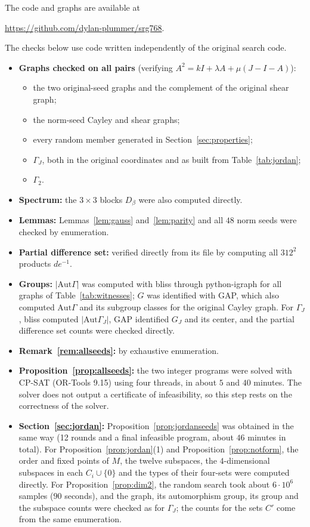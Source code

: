 \documentclass[11pt]{amsart}
\theoremstyle{definition}
\newcommand{\Aut}{\mathrm{Aut}}
\begin{document}
The code and graphs are available at
\begin{center}\url{https://github.com/dylan-plummer/srg768}.\end{center}
The checks below use code written independently of the original search code.
\begin{itemize}
\item \textbf{Graphs checked on all pairs} (verifying $A^2=kI+\lambda A+\mu(J-I-A)$):
  \begin{itemize}
  \item the two original-seed graphs and the complement of the original shear graph;
  \item the norm-seed Cayley and shear graphs;
  \item every random member generated in Section~\ref{sec:properties};
  \item $\Gamma_J$, both in the original coordinates and as built from Table~\ref{tab:jordan};
  \item $\Gamma_2$.
  \end{itemize}
\item \textbf{Spectrum:} the $3\times3$ blocks $D_\beta$ were also computed directly.
\item \textbf{Lemmas:} Lemmas~\ref{lem:gauss} and~\ref{lem:parity} and all $48$ norm seeds were checked by enumeration.
\item \textbf{Partial difference set:} verified directly from its file by computing all $312^2$ products $de^{-1}$.
\item \textbf{Groups:} $|\Aut\Gamma|$ was computed with bliss through python-igraph for all graphs of Table~\ref{tab:witnesses}; $G$ was identified with GAP, which also computed $\Aut\Gamma$ and its subgroup classes for the original Cayley graph. For $\Gamma_J$, bliss computed $|\Aut\Gamma_J|$, GAP identified $G_J$ and its center, and the partial difference set counts were checked directly.
\item \textbf{Remark~\ref{rem:allseeds}:} by exhaustive enumeration.
\item \textbf{Proposition~\ref{prop:allseeds}:} the two integer programs were solved with CP-SAT (OR-Tools 9.15) using four threads, in about $5$ and $40$ minutes. The solver does not output a certificate of infeasibility, so this step rests on the correctness of the solver.
\item \textbf{Section~\ref{sec:jordan}:} Proposition~\ref{prop:jordanseeds} was obtained in the same way (12 rounds and a final infeasible program, about $46$ minutes in total). For Proposition~\ref{prop:jordan}(1) and Proposition~\ref{prop:notform}, the order and fixed points of $M$, the twelve subspaces, the $4$-dimensional subspaces in each $C_i\cup\{0\}$ and the types of their four-sets were computed directly. For Proposition~\ref{prop:dim2}, the random search took about $6\cdot10^6$ samples ($90$ seconds), and the graph, its automorphism group, its group and the subspace counts were checked as for $\Gamma_J$; the counts for the sets $C'$ come from the same enumeration.
\end{itemize}
\end{document}
